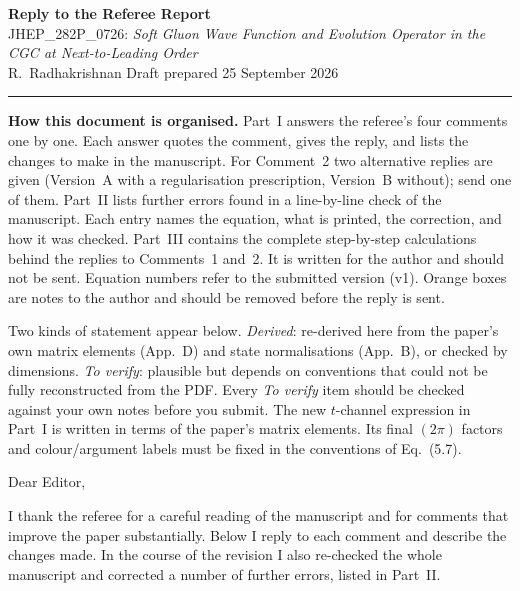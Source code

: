 \documentclass[11pt,a4paper]{article}
\newcommand{\eq}[1]{Eq.~(#1)}
\begin{document}
\begin{center}
{\LARGE\bfseries Reply to the Referee Report}\\[4pt]
{\large JHEP\_282P\_0726: \emph{Soft Gluon Wave Function and Evolution Operator in the CGC at Next-to-Leading Order}}\\[4pt]
R.~Radhakrishnan \hfill Draft prepared 25 September 2026
\end{center}
\hrule
\vspace{6pt}

\textbf{How this document is organised.}
Part~I answers the referee's four comments one by one. Each answer quotes the comment, gives the reply, and lists the changes to make in the manuscript.
For Comment~2 two alternative replies are given (Version~A with a regularisation prescription, Version~B without); send one of them.
Part~II lists further errors found in a line-by-line check of the manuscript. Each entry names the equation, what is printed, the correction, and how it was checked.
Part~III contains the complete step-by-step calculations behind the replies to Comments~1 and~2. It is written for the author and should not be sent.
Equation numbers refer to the submitted version (v1). Orange boxes are notes to the author and should be removed before the reply is sent.

\begin{authornote}
Two kinds of statement appear below. \emph{Derived}: re-derived here from the paper's own matrix elements (App.~D) and state normalisations (App.~B), or checked by dimensions. \emph{To verify}: plausible but depends on conventions that could not be fully reconstructed from the PDF. Every \emph{To verify} item should be checked against your own notes before you submit. The new $t$-channel expression in Part~I is written in terms of the paper's matrix elements. Its final $(2\pi)$ factors and colour/argument labels must be fixed in the conventions of \eq{5.7}.
\end{authornote}

\vspace{4pt}
\noindent Dear Editor,

I thank the referee for a careful reading of the manuscript and for comments that improve the paper substantially. Below I reply to each comment and describe the changes made. In the course of the revision I also re-checked the whole manuscript and corrected a number of further errors, listed in Part~II.

\end{document}
